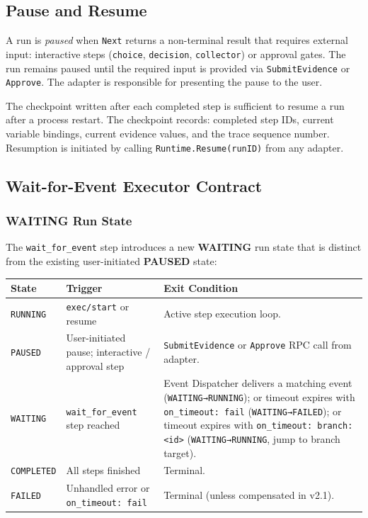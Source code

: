 \subsection{Pause and Resume}

A run is \emph{paused} when \texttt{Next} returns a non-terminal result that requires external
input: interactive steps (\texttt{choice}, \texttt{decision}, \texttt{collector}) or approval
gates. The run remains paused until the required input is provided via \texttt{SubmitEvidence}
or \texttt{Approve}. The adapter is responsible for presenting the pause to the user.

The checkpoint written after each completed step is sufficient to resume a run after a
process restart. The checkpoint records: completed step IDs, current variable bindings,
current evidence values, and the trace sequence number. Resumption is initiated by calling
\texttt{Runtime.Resume(runID)} from any adapter.

\subsection{Wait-for-Event Executor Contract}
\label{sec:wait_for_event_contract}

\subsubsection*{WAITING Run State}

The \texttt{wait\_for\_event} step introduces a new \textbf{WAITING} run state that is distinct
from the existing user-initiated \textbf{PAUSED} state:

\begin{center}
\begin{tabular}{|l|l|p{7.5cm}|}
\hline
\textbf{State} & \textbf{Trigger} & \textbf{Exit Condition} \\
\hline
\texttt{RUNNING}  & \texttt{exec/start} or resume & Active step execution loop. \\
\hline
\texttt{PAUSED}   & User-initiated pause; interactive / approval step & \texttt{SubmitEvidence} or \texttt{Approve} RPC call from adapter. \\
\hline
\texttt{WAITING}  & \texttt{wait\_for\_event} step reached & Event Dispatcher delivers a matching event (\texttt{WAITING→RUNNING}); or timeout expires with \texttt{on\_timeout: fail} (\texttt{WAITING→FAILED}); or timeout expires with \texttt{on\_timeout: branch:<id>} (\texttt{WAITING→RUNNING}, jump to branch target). \\
\hline
\texttt{COMPLETED} & All steps finished & Terminal. \\
\hline
\texttt{FAILED}   & Unhandled error or \texttt{on\_timeout: fail} & Terminal (unless compensated in v2.1). \\
\hline
\end{tabular}
\end{center}

